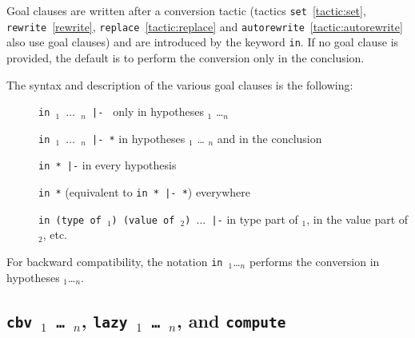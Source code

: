 \begin{coq_example*}
Goal clauses are written after a conversion tactic (tactics
\texttt{set}~\ref{tactic:set},          \texttt{rewrite}~\ref{rewrite},
\texttt{replace}~\ref{tactic:replace}                               and
\texttt{autorewrite}~\ref{tactic:autorewrite} also use goal clauses)  and
are introduced by  the keyword \texttt{in}. If no goal clause is provided,
the default is to perform the conversion only in the conclusion.

The syntax and description of the various goal clauses is the following:
\begin{description}
\item[]\texttt{in {\ident}$_1$ $\ldots$ {\ident}$_n$ |- } only in hypotheses {\ident}$_1$
  \ldots {\ident}$_n$
\item[]\texttt{in {\ident}$_1$ $\ldots$ {\ident}$_n$ |- *} in hypotheses {\ident}$_1$ \ldots
  {\ident}$_n$ and in the conclusion
\item[]\texttt{in * |-} in every hypothesis
\item[]\texttt{in *} (equivalent to \texttt{in * |- *}) everywhere
\item[]\texttt{in (type of {\ident}$_1$) (value of {\ident}$_2$) $\ldots$ |-} in
  type part of {\ident}$_1$, in the value part of {\ident}$_2$, etc.
\end{description}

For backward compatibility, the notation \texttt{in}~{\ident}$_1$\ldots {\ident}$_n$
performs the conversion in hypotheses {\ident}$_1$\ldots {\ident}$_n$.


\subsection{{\tt cbv \flag$_1$ \mbox{\dots} \flag$_n$}, {\tt lazy \flag$_1$
\mbox{\dots} \flag$_n$}, and \tt compute}
\label{vmcompute}
\label{nativecompute}


\end{coq_example*}
